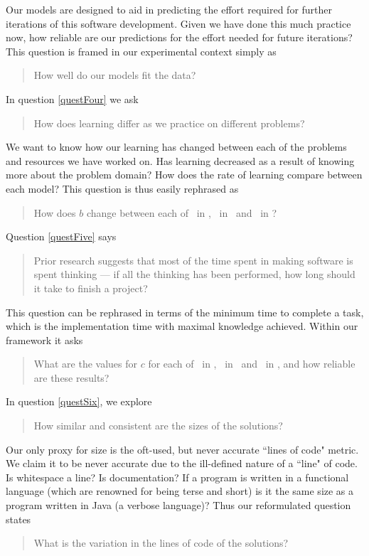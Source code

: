 Our models are designed to aid in predicting the effort required for further iterations of
this software development.
Given we have done this much practice now, how reliable are our predictions for
the effort needed for future iterations?
This question is framed in our experimental context simply as
\begin{quote}
  How well do our models fit the data?
\end{quote}\label{qq3}

In question \ref{questFour} we ask
\begin{quote}
  How does learning differ as we practice on different problems? 
\end{quote}

We want to know how our learning has changed between each of the problems and
resources we have worked on.
Has learning decreased as a result of knowing more about the problem domain?
How does the rate of learning compare between each model?
This question is thus easily rephrased as
\begin{quote}
   How does $b$ change between each of \PO\ in \LA, \PO\ in
   \LB\ and \PT\ in \LA?
\end{quote} \label{qq4}

Question \ref{questFive} says
\begin{quote}
  Prior research suggests that most of the time spent in making software is spent
  thinking --- if all the thinking has been performed, how long should it take to
  finish a project?
\end{quote}

This question can be rephrased in terms of the minimum time to complete a task,
which is the implementation time with maximal knowledge achieved.
Within our framework it asks
\begin{quote}
  What are the values for $c$ for each of \PO\ in \LA, \PO\ in \LB\ and \PT\ in
  \LA, and how reliable are these results?
\end{quote} \label{qq5}

In question \ref{questSix}, we explore
\begin{quote}
  How similar and consistent are the sizes of the solutions?
\end{quote}

Our only proxy for size is the oft-used, but never accurate ``lines of code"
metric.
We claim it to be never accurate due to the ill-defined nature of a ``line" of
code.
Is whitespace a line?
Is documentation?
If a program is written in a functional language (which are renowned for being
terse and short) is it the same size as a program written in Java (a verbose
language)?
Thus our reformulated question states
\begin{quote}
  What is the variation in the lines of code of the solutions?
\end{quote} \label{qq6}

